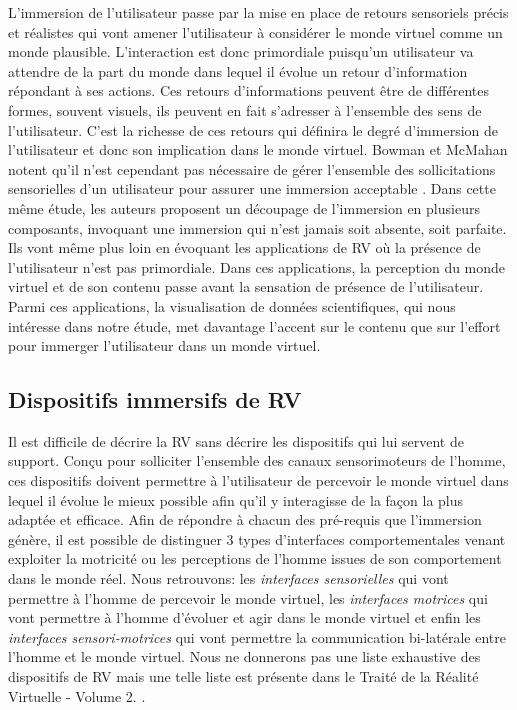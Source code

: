 L'immersion de l'utilisateur passe par la mise en place de retours sensoriels précis et réalistes qui vont amener l'utilisateur à considérer le monde virtuel comme un monde plausible. L'interaction est donc primordiale puisqu'un utilisateur va attendre de la part du monde dans lequel il évolue un retour d'information répondant à ses actions. Ces retours d'informations peuvent être de différentes formes, souvent visuels, ils peuvent en fait s'adresser à l'ensemble des sens de l'utilisateur. C'est la richesse de ces retours qui définira le degré d'immersion de l'utilisateur et donc son implication dans le monde virtuel. Bowman et McMahan notent qu'il n'est cependant pas nécessaire de gérer l'ensemble des sollicitations sensorielles d'un utilisateur pour assurer une immersion acceptable \cite{bowman_virtual_2007}. Dans cette même étude, les auteurs proposent un découpage de l'immersion en plusieurs composants, invoquant une immersion qui n'est jamais soit absente, soit parfaite. Ils vont même plus loin en évoquant les applications de RV où la présence de l'utilisateur n'est pas primordiale. Dans ces applications, la perception du monde virtuel et de son contenu passe avant la sensation de présence de l'utilisateur. Parmi ces applications, la visualisation de données scientifiques, qui nous intéresse dans notre étude, met davantage l'accent sur le contenu que sur l'effort pour immerger l'utilisateur dans un monde virtuel.

\subsection{Dispositifs immersifs de RV}

Il est difficile de décrire la RV sans décrire les dispositifs qui lui servent de support. Conçu pour solliciter l'ensemble des canaux sensorimoteurs de l'homme, ces dispositifs doivent permettre à l'utilisateur de percevoir le monde virtuel dans lequel il évolue le mieux possible afin qu'il y interagisse de la façon la plus adaptée et efficace.
Afin de répondre à chacun des pré-requis que l'immersion génère, il est possible de distinguer 3 types d'interfaces comportementales venant exploiter la motricité ou les perceptions de l'homme issues de son comportement dans le monde réel.
Nous retrouvons: les \textit{interfaces sensorielles} qui vont permettre à l'homme de percevoir le monde virtuel, les \textit{interfaces motrices} qui vont permettre à l'homme d'évoluer et agir dans le monde virtuel et enfin les \textit{interfaces sensori-motrices} qui vont permettre la communication bi-latérale entre l'homme et le monde virtuel.
Nous ne donnerons pas une liste exhaustive des dispositifs de RV mais une telle liste est présente dans le Traité de la Réalité Virtuelle - Volume 2. \cite{fuchs2006traite}.

